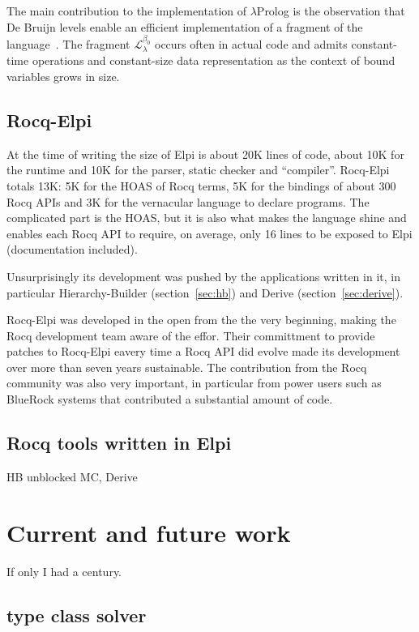 \documentclass[a4paper, 11pt]{book}
\begin{document}
The main contribution to the implementation of $\lambda$Prolog is
the observation that De Bruijn levels enable an efficient implementation
of a fragment of the language~\cite{dunchev15lpar}. The fragment
$\mathcal{L}_\lambda^{\beta_0}$ occurs often in actual code and admits
constant-time operations and constant-size data representation as the
context of bound variables grows in size.

\subsection{Rocq-Elpi}

At the time of writing the size of Elpi is about 20K lines of code, about 10K
for the runtime and 10K for the parser, static checker and ``compiler''.
Rocq-Elpi totals 13K: 5K for the HOAS of Rocq terms, 5K for the bindings of about
300 Rocq APIs and 3K for the vernacular language to declare programs. The complicated
part is the HOAS, but it is also what makes the language shine and enables
each Rocq API to require, on average, only 16 lines to be exposed to Elpi
(documentation included).

Unsurprisingly its development was pushed by the applications written in it,
in particular Hierarchy-Builder (section~\ref{sec:hb}) and Derive (section~\ref{sec:derive}).

Rocq-Elpi was developed in the open from the the very beginning, making the
Rocq development team aware of the effor. Their committment to
provide patches to Rocq-Elpi eavery time a Rocq API did evolve made its
development over more than seven years sustainable. The contribution 
from the Rocq community was also very important, in particular from
power users such as BlueRock systems that contributed a substantial amount
of code.

\subsection{Rocq tools written in Elpi}

HB unblocked MC, Derive


\section{Current and future work}

If only I had a century.

\subsection{type class solver}
\end{document}
